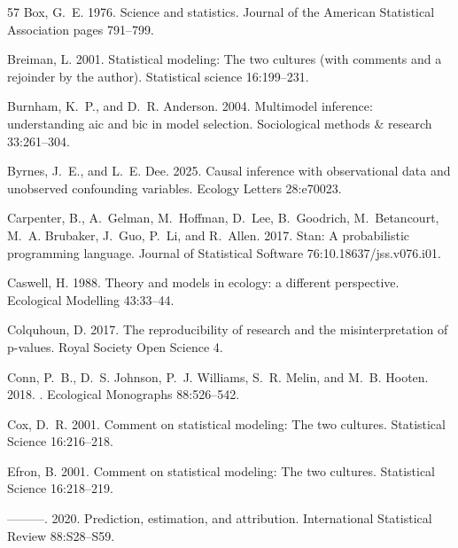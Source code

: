 \documentclass[11pt]{article}
\begin{document}
\begin{thebibliography}{57}
Box, G.~E. 1976.
\newblock Science and statistics.
\newblock Journal of the American Statistical Association pages 791--799.

Breiman, L. 2001.
\newblock Statistical modeling: The two cultures (with comments and a rejoinder
  by the author).
\newblock Statistical science 16:199--231.

Burnham, K.~P., and D.~R. Anderson. 2004.
\newblock Multimodel inference: understanding aic and bic in model selection.
\newblock Sociological methods \& research 33:261--304.

Byrnes, J.~E., and L.~E. Dee. 2025.
\newblock Causal inference with observational data and unobserved confounding
  variables.
\newblock Ecology Letters 28:e70023.

Carpenter, B., A.~Gelman, M.~Hoffman, D.~Lee, B.~Goodrich, M.~Betancourt, M.~A.
  Brubaker, J.~Guo, P.~Li, and R.~Allen. 2017.
\newblock Stan: A probabilistic programming language.
\newblock Journal of Statistical Software 76:10.18637/jss.v076.i01.

Caswell, H. 1988.
\newblock Theory and models in ecology: a different perspective.
\newblock Ecological Modelling 43:33--44.

Colquhoun, D. 2017.
\newblock The reproducibility of research and the misinterpretation of
  p-values.
\newblock Royal Society Open Science 4.

Conn, P.~B., D.~S. Johnson, P.~J. Williams, S.~R. Melin, and M.~B. Hooten.
  2018.
.
\newblock Ecological Monographs 88:526--542.

Cox, D.~R. 2001.
\newblock Comment on statistical modeling: The two cultures.
\newblock Statistical Science 16:216--218.

Efron, B. 2001.
\newblock Comment on statistical modeling: The two cultures.
\newblock Statistical Science 16:218--219.

---{}---{}---. 2020.
\newblock Prediction, estimation, and attribution.
\newblock International Statistical Review 88:S28--S59.


\end{thebibliography}
\end{document}
